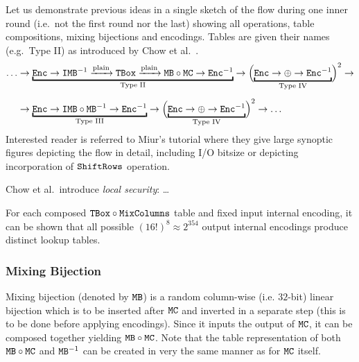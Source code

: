 	Let us demonstrate previous ideas in a single sketch of the flow during one inner round (i.e.\ not the first round nor the last) showing all operations, table compositions, mixing bijections and encodings. Tables are given their names (e.g.\ Type II) as introduced by Chow et al.\ \cite{chow2002aes}.
	\begin{align}
	\label{eq:wbaesflow} %
		\ldots&\rarr\underbracket{\Enc\rarr\IMB^{-1}\xrightarrow{\textnormal{plain}}\TBox\xrightarrow{\textnormal{plain}}\MB\circ\MC\rarr\Enc^{-1}}_{\textnormal{Type II}}\rarr\Bigl(\underbracket{\Enc\rarr\xor\rarr\Enc^{-1}}_{\textnormal{Type IV}}\Bigr)^2\rarr\nonumber\\[.5em]
		&\rarr\underbracket{\Enc\rarr\IMB\circ\MB^{-1}\rarr\Enc^{-1}}_{\textnormal{Type III}}\rarr\Bigl(\underbracket{\Enc\rarr\xor\rarr\Enc^{-1}}_{\textnormal{Type IV}}\Bigr)^2\rarr\ldots
	\end{align}
	Interested reader is referred to Miur's tutorial \cite{muir2013tutorial} where they give large synoptic figures depicting the flow in detail, including I/O bitsize or depicting incorporation of $\texttt{ShiftRows}$ operation.
	
	
	\begin{remark}
	\label{rem:localsec}
		Chow et al.\ introduce {\em local security}: \ldots
		
		For each composed $\texttt{TBox}\circ\texttt{MixColumns}$ table and fixed input internal encoding, it can be shown that all possible $(16!)^8 \approx 2^{354}$ output internal encodings produce distinct lookup tables.
	\end{remark}
	

\subsubsection{Mixing Bijection}
	
	Mixing bijection (denoted by $\texttt{MB}$) is a random column-wise (i.e. $32$-bit) linear bijection which is to be inserted after $\texttt{MC}$ and inverted in a separate step (this is to be done before applying encodings). Since it inputs the output of $\texttt{MC}$, it can be composed together yielding $\texttt{MB}\circ\texttt{MC}$. Note that the table representation of both $\texttt{MB}\circ\texttt{MC}$ and $\texttt{MB}^{-1}$ can be created in very the same manner as for $\texttt{MC}$ itself.
	
